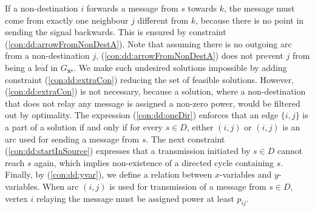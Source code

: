 If a non-destination $i$ forwards a message from $s$ towards $k$, the message must come from exactly one neighbour $j$ different from $k$, because there is no point in sending the signal backwards. This is ensured by constraint (\ref{con:dd:arrowFromNonDestA}). Note that assuming there is no outgoing arc from a non-destination $j$, (\ref{con:dd:arrowFromNonDestA}) does not prevent $j$ from being a leaf in $G_{\mathbf{x^s}}$. We make such undesired solutions impossible by adding constraint (\ref{con:dd:extraCon}) reducing the set of feasible solutions. However, (\ref{con:dd:extraCon}) is not necessary, because a solution, where a non-destination that does not relay any message is assigned a non-zero power, would be filtered out by optimality. The expression (\ref{con:dd:oneDir}) enforces that an edge $\{i,j\}$ is a part of a solution if and only if for every $s\in D$, either $(i,j)$ or $(i,j)$ is an arc used for sending a message from $s$. The next constraint (\ref{con:dd:startInSource}) expresses that a transmission initiated by $s\in D$ cannot reach $s$ again, which implies non-existence of a directed cycle containing $s$. Finally, by (\ref{con:dd:yvar}), we define a relation between $x$-variables and $y$-variables. When arc $(i,j)$ is used for transmission of a message from $s\in D$, vertex $i$ relaying the message must be assigned power at least $p_{ij}$.

